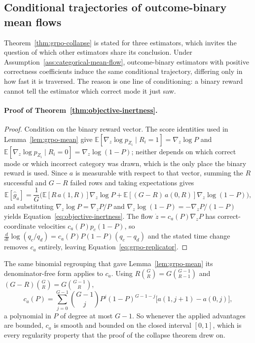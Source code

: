 \documentclass{article}
\newcommand{\enforcehalffinalproseline}{%
  \setlength{\parfillskip}{0pt plus .20\linewidth}}
\newcommand{\1}{\mathbf 1}
\newcommand{\E}{\mathbb E}
\theoremstyle{remark}
\theoremstyle{definition}
\theoremstyle{plain}
\begin{document}
\subsection{Conditional trajectories of outcome-binary mean flows}
\label{app:theory-objective-inertness}

Theorem~\ref{thm:grpo-collapse} is stated for three estimators, which invites
the question of which other estimators share its conclusion. Under
Assumption~\ref{ass:categorical-mean-flow}, outcome-binary estimators with
positive correctness coefficients induce the same conditional trajectory,
differing only in how fast it is traversed. The
reason is one line of conditioning: a binary reward cannot tell the estimator
which correct mode it just saw.

\paragraph{Proof of Theorem~\ref{thm:objective-inertness}.}

\begin{proof}
\enforcehalffinalproseline
Condition on the binary reward vector. The score identities used in
Lemma~\ref{lem:grpo-mean} give
$\E[\nabla_z\log p_{Z_i}\mid R_i=1]=\nabla_z\log P$ and
$\E[\nabla_z\log p_{Z_i}\mid R_i=0]=\nabla_z\log(1-P)$; neither depends on
which correct mode or which incorrect category was drawn, which is the only
place the binary reward is used. Since $a$ is measurable with respect to that
vector, summing the $R$ successful and $G-R$ failed rows and taking
expectations gives
\[
  \E[\widehat g_a]
  =\frac1G\Big(\E[R\,a(1,R)]\nabla_z\log P
   +\E[(G-R)\,a(0,R)]\nabla_z\log(1-P)\Big),
\]
and substituting $\nabla_z\log P=\nabla_zP/P$ and
$\nabla_z\log(1-P)=-\nabla_zP/(1-P)$ yields
Equation~\eqref{eq:objective-inertness}. The flow
$\dot z=c_a(P)\nabla_zP$ has correct-coordinate velocities
$c_a(P)p_c(1-P)$, so $\frac{d}{dt}\log(q_c/q_d)=c_a(P)P(1-P)(q_c-q_d)$ and the
stated time change removes $c_a$ entirely, leaving
Equation~\eqref{eq:grpo-replicator}.
\end{proof}


The same binomial regrouping that gave Lemma~\ref{lem:grpo-mean} its
denominator-free form applies to $c_a$. Using $R\binom GR=G\binom{G-1}{R-1}$
and $(G-R)\binom GR=G\binom{G-1}{R}$,
\begin{equation}
 c_a(P)=\sum_{j=0}^{G-1}\binom{G-1}{j}P^j(1-P)^{G-1-j}
 \big[a(1,j+1)-a(0,j)\big],
 \label{eq:inertness-polynomial}
\end{equation}
a polynomial in $P$ of degree at most $G-1$. So whenever the applied advantages
are bounded, $c_a$ is smooth and bounded on the closed interval $[0,1]$, which
is every regularity property that the proof of the collapse theorem drew on.
\end{document}
